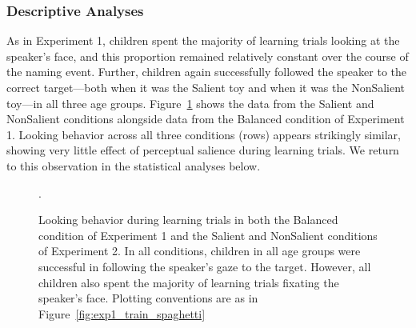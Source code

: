 \documentclass[man,floatsintext]{apa6}
\begin{document}
\subsubsection{Descriptive Analyses}

As in Experiment 1, children spent the majority of learning trials looking at the speaker's face, and this proportion remained relatively constant over the course of the naming event. Further, children again successfully followed the speaker to the correct target---both when it was the Salient toy and when it was the NonSalient toy---in all three age groups. Figure~\ref{fig:exp1and2_train_spaghetti} shows the data from the Salient and NonSalient conditions alongside data from the Balanced condition of Experiment 1. Looking behavior across all three conditions (rows) appears strikingly similar, showing very little effect of perceptual salience during learning trials. We return to this observation in the statistical analyses below.

\begin{figure}[tb]
	\caption{\label{fig:exp1and2_train_spaghetti} Looking behavior during learning trials in both the Balanced condition of Experiment 1 and the Salient and NonSalient conditions of Experiment 2. In all conditions, children in all age groups were successful in following the speaker's gaze to the target. However, all children also spent the majority of learning trials fixating the speaker's face. Plotting conventions are as in Figure~\ref{fig:exp1_train_spaghetti}}.
\end{figure}
\end{document}
